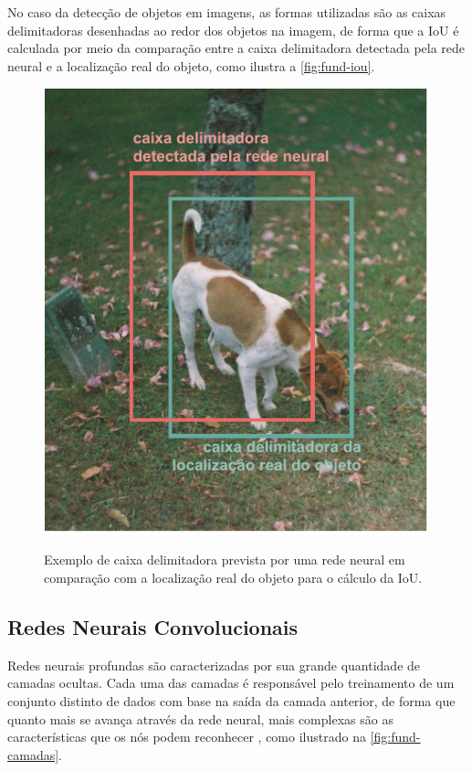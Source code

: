 No caso da detecção de objetos em imagens, as formas utilizadas são as caixas delimitadoras desenhadas ao redor dos objetos na imagem, de forma que a IoU é calculada por meio da comparação entre a caixa delimitadora detectada pela rede neural e a localização real do objeto, como ilustra a \autoref{fig:fund-iou}.

\begin{figure}[h!] %
  \centering
  \caption{Exemplo de caixa delimitadora prevista por uma rede neural em comparação com a localização real do objeto para o cálculo da IoU.}
  \includegraphics[scale=1.1]{img/img-fundamentacao-iou.pdf}
  \label{fig:fund-iou}
\end{figure}



\subsection{Redes Neurais Convolucionais} \label{cap:fund-ia-rn-conv}
Redes neurais profundas são caracterizadas por sua grande quantidade de camadas ocultas. Cada uma das camadas é responsável pelo treinamento de um conjunto distinto de dados com base na saída da camada anterior, de forma que quanto mais se avança através da rede neural, mais complexas são as características que os nós podem reconhecer \cite{ref:Nicholson}, como ilustrado na \autoref{fig:fund-camadas}.

